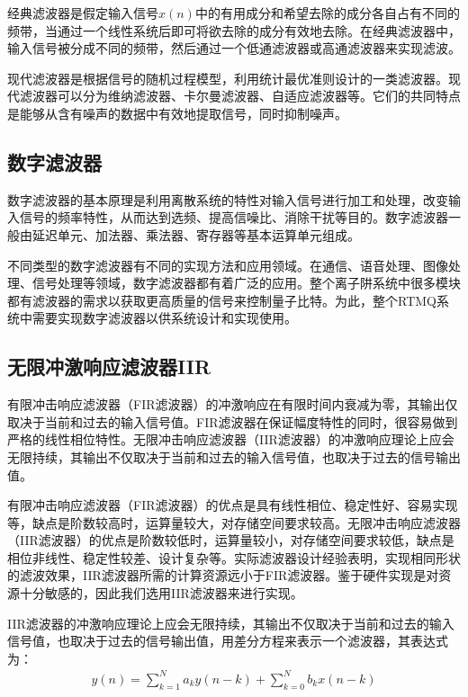 经典滤波器是假定输入信号$x(n)$中的有用成分和希望去除的成分各自占有不同的频带，当通过一个线性系统后即可将欲去除的成分有效地去除。在经典滤波器中，输入信号被分成不同的频带，然后通过一个低通滤波器或高通滤波器来实现滤波。
 
现代滤波器是根据信号的随机过程模型，利用统计最优准则设计的一类滤波器。现代滤波器可以分为维纳滤波器、卡尔曼滤波器、自适应滤波器等。它们的共同特点是能够从含有噪声的数据中有效地提取信号，同时抑制噪声。


\subsection[数字滤波器]{数字滤波器}

数字滤波器的基本原理是利用离散系统的特性对输入信号进行加工和处理，改变输入信号的频率特性，从而达到选频、提高信噪比、消除干扰等目的。数字滤波器一般由延迟单元、加法器、乘法器、寄存器等基本运算单元组成。
 
不同类型的数字滤波器有不同的实现方法和应用领域。在通信、语音处理、图像处理、信号处理等领域，数字滤波器都有着广泛的应用。整个离子阱系统中很多模块都有滤波器的需求以获取更高质量的信号来控制量子比特。为此，整个RTMQ系统中需要实现数字滤波器以供系统设计和实现使用。



\subsection[无限冲激响应滤波器IIR]{无限冲激响应滤波器IIR}
有限冲击响应滤波器（FIR滤波器）的冲激响应在有限时间内衰减为零，其输出仅取决于当前和过去的输入信号值。FIR滤波器在保证幅度特性的同时，很容易做到严格的线性相位特性。无限冲击响应滤波器（IIR滤波器）的冲激响应理论上应会无限持续，其输出不仅取决于当前和过去的输入信号值，也取决于过去的信号输出值。

有限冲击响应滤波器（FIR滤波器）的优点是具有线性相位、稳定性好、容易实现等，缺点是阶数较高时，运算量较大，对存储空间要求较高。无限冲击响应滤波器（IIR滤波器）的优点是阶数较低时，运算量较小，对存储空间要求较低，缺点是相位非线性、稳定性较差、设计复杂等。实际滤波器设计经验表明，实现相同形状的滤波效果，IIR滤波器所需的计算资源远小于FIR滤波器。鉴于硬件实现是对资源十分敏感的，因此我们选用IIR滤波器来进行实现。

IIR滤波器的冲激响应理论上应会无限持续，其输出不仅取决于当前和过去的输入信号值，也取决于过去的信号输出值，用差分方程来表示一个滤波器，其表达式为：
\begin{align}
    y(n)=\sum_{k=1}^Na_ky(n-k)+\sum_{k=0}^Nb_kx(n-k)\label{eq:iir_filter}
\end{align}


